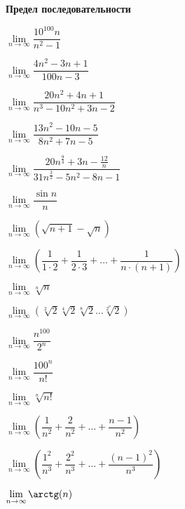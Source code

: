 \documentclass{article}
\begin{document}
    \large

    \begin{center}
        \textbf{Предел последовательности}
    \end{center}

    \begin{enumerate_boxed}

        \begin{multicols}{2}
            \item $\lim\limits_{n \to \infty}{\dfrac{10^{100}n}{n^2 - 1}}$

            \item $\lim\limits_{n \to \infty}{\dfrac{4n^2 - 3n + 1}{100n - 3}}$

            \item $\lim\limits_{n \to \infty}{\dfrac{20n^2 + 4n + 1}{n^3 - 10 n^2 + 3 n - 2}}$

            \item $\lim\limits_{n \to \infty}{\dfrac{13n^2 - 10n - 5}{8n^2 + 7 n - 5}}$

            \item $\lim\limits_{n \to \infty}{\dfrac{20n^{\frac{9}{4}}  + 3n - \frac{12}{n}}{31n^{\frac{3}{2}} - 5n^2 - 8n - 1}}$

            \item $\lim\limits_{n \to \infty}{\dfrac{\sin{n}}{n}}$

            \item $\lim\limits_{n \to \infty}\left({\sqrt{n + 1} - \sqrt{n}}\right)$

            \item $\lim\limits_{n \to \infty}\left({\dfrac{1}{1 \cdot 2} + \dfrac{1}{2 \cdot 3} + \dots + \dfrac{1}{n \cdot (n+1)}}\right)$

            \item $\lim\limits_{n \to \infty}{\sqrt[n]{n}} $

            \item $\lim\limits_{n \to \infty}\left({\sqrt[2]{2}\sqrt[4]{2}\sqrt[8]{2} \dots \sqrt[2^n]{2}}\right)$

            \item $\lim\limits_{n \to \infty}{\dfrac{n^{100}}{2^n}}$

            \item $\lim\limits_{n \to \infty}{\dfrac{100^n}{n!}}$

            \item $\lim\limits_{n \to \infty}{\sqrt[n]{n!}} $

            \item $\lim\limits_{n \to \infty}\left({\dfrac{1}{n^2} + \dfrac{2}{n^2} + \dots + \dfrac{n-1}{n^2}}\right)$

            \item $\lim\limits_{n \to \infty}\left({\dfrac{1^2}{n^3} + \dfrac{2^2}{n^3} + \dots + \dfrac{(n-1)^2}{n^3}}\right)$

            \item $\lim\limits_{n \to \infty}{\arctg(n)}$
        \end{multicols}
    \end{enumerate_boxed}
\end{document}
